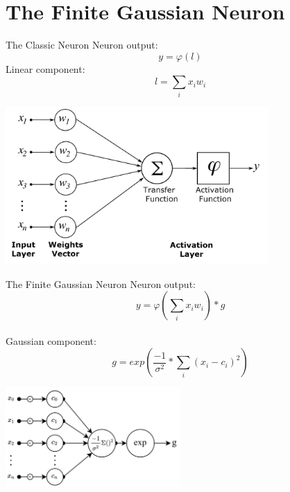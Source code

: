 \documentclass{beamer}
\begin{document}
\section{The Finite Gaussian Neuron}
\begin{frame}{The Classic Neuron}
Neuron output: 
$$y = \varphi(l)$$
Linear component:
$$l=\sum_i x_i w_i$$

\begin{center}
    \includegraphics[width=0.75\textwidth]{images/artificial_neuron_model.png}
\end{center}
\end{frame}

\begin{frame}{The Finite Gaussian Neuron}
Neuron output:
$$ y = \varphi(\sum_i x_i w_i) * g$$ \\ 
Gaussian component:
$$ g = exp \left( \frac{-1}{\sigma^2}*\sum_{i}(x_i-c_i)^2 \right)$$

\begin{center}
    \includegraphics[width=0.5\textwidth]{images/fgn-gaussian-component.png}
\end{center}

\end{frame}
\end{document}
